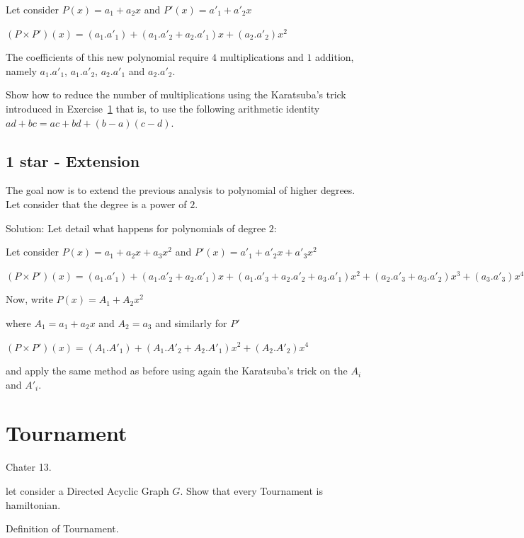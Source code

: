 \documentclass{article}[12pt]
\begin{document}
Let consider $P(x) = a_1 + a_2 x $ and $P'(x) = a'_1 + a'_2 x $

$(P \times P')(x) = (a_1.a'_1) + (a_1.a'_2 + a_2.a'_1) x + (a_2.a'_2) x^2$

The coefficients of this new polynomial require $4$ multiplications and $1$ addition, 
namely $a_1.a'_1$, $a_1.a'_2$, $a_2.a'_1$ and $a_2.a'_2$.
\bigskip

Show how to reduce the number of multiplications using the Karatsuba's trick 
introduced in Exercise~\ref{} that is, 
to use the following arithmetic identity $ad+bc = ac + bd + (b-a)(c-d)$.

\subsection{1 star - Extension}

The goal now is to extend the previous analysis to polynomial of higher degrees.
Let consider that the degree is a power of $2$.
\bigskip

Solution:
Let detail what happens for polynomials of degree $2$:

Let consider $P(x) = a_1 + a_2 x + a_3 x^2$ and $P'(x) = a'_1 + a'_2 x + a'_3 x^2$

$(P \times P')(x) = (a_1.a'_1) + (a_1.a'_2 + a_2.a'_1) x + (a_1.a'_3 + a_2.a'_2 + a_3.a'_1) x^2 + (a_2.a'_3 + a_3.a'_2) x^3 +  (a_3.a'_3) x^4$
\bigskip

Now, write $P(x) = A_1 + A_2 x^2$ 

where $A_1 = a_1 + a_2 x$ and $A_2 = a_3$ and similarly for $P'$

$(P \times P')(x) = (A_1.A'_1) + (A_1.A'_2 + A_2.A'_1) x^2 + (A_2.A'_2) x^4$ 

and apply the same method as before using again the Karatsuba's trick on the $A_i$ and $A'_i$.



\section{Tournament}

Chater 13.

let consider a Directed Acyclic Graph $G$.
Show that every Tournament is hamiltonian.

Definition of Tournament.
\end{document}
